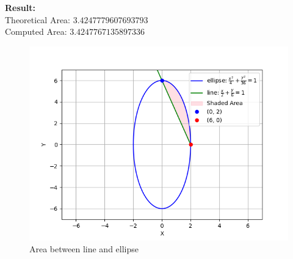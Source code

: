 \documentclass[journal]{IEEEtran}
\numberwithin{equation}{enumi}
\numberwithin{figure}{enumi}
\begin{document}
\textbf{Result:}\\
Theoretical Area: $3.4247779607693793$\\
Computed Area: $3.4247767135897336$

\begin{figure}[ht]
   \centering
   \includegraphics[width=0.7\columnwidth]{figs/fig.png}
    \caption{Area between line and ellipse}
\end{figure}
\end{document}
